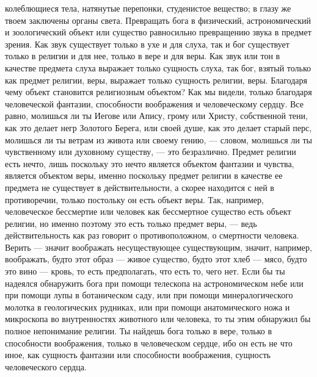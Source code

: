 \documentclass[12pt,oneside]{book}
\begin{document}
колеблющиеся тела, натянутые перепонки, студенистое вещество; в глазу же твоем заключены органы света. Превращать бога в физический, астрономический и зоологический объект или существо равносильно превращению звука в предмет зрения. Как звук существует только в ухе и для слуха, так и бог существует только в религии и для нее, только в вере и для веры. Как звук или тон в качестве предмета слуха выражает только сущность слуха, так бог, взятый только как предмет религии, веры, выражает только сущность религии, веры. Благодаря чему объект становится религиозным объектом? Как мы видели, только благодаря человеческой фантазии, способности воображения и человеческому сердцу. Все равно, молишься ли ты Иегове или Апису, грому или Христу, собственной тени, как это делает негр Золотого Берега, или своей душе, как это делает старый перс, молишься ли ты ветрам из живота или своему гению, --- словом, молишься ли ты чувственному или духовному существу, --- это безразлично. Предмет религии есть нечто, лишь поскольку это нечто является объектом фантазии и чувства, является объектом веры, именно поскольку предмет религии в качестве ее предмета не существует в действительности, а скорее находится с ней в противоречии, только постольку он есть объект веры. Так, например, человеческое бессмертие или человек как бессмертное существо есть объект религии, но именно поэтому это есть только предмет веры, --- ведь действительность как раз говорит о противоположном, о смертности человека. Верить --- значит воображать несуществующее существующим, значит, например, воображать, будто этот образ --- живое существо, будто этот хлеб --- мясо, будто это вино --- кровь, то есть предполагать, что есть то, чего нет. Если бы ты надеялся обнаружить бога при помощи телескопа на астрономическом небе или при помощи лупы в ботаническом саду, или при помощи минералогического молотка в геологических рудниках, или при помощи анатомического ножа и микроскопа во внутренностях животного или человека, то ты этим обнаружил бы полное непонимание религии. Ты найдешь бога только в вере, только в способности воображения, только в человеческом сердце, ибо он есть не что иное, как сущность фантазии или способности воображения, сущность человеческого сердца.


\chapter{}
\end{document}
